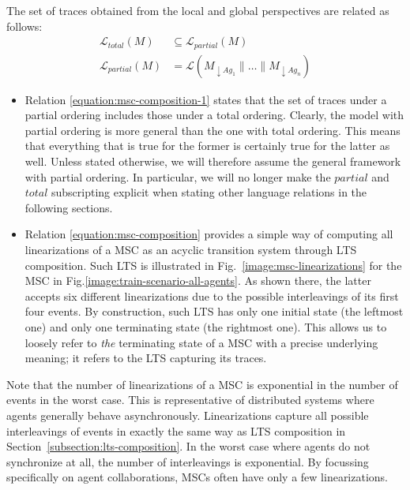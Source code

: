 The set of traces obtained from the local and global perspectives are related as follows:
\begin{align}
\mathcal{L}_{total}(M) & \subseteq \mathcal{L}_{partial}(M) 
\label{equation:msc-composition-1} \\
\mathcal{L}_{partial}(M) &= \mathcal{L}(M_{\downarrow Ag_1} \parallel \ldots \parallel M_{\downarrow Ag_n})
\label{equation:msc-composition}
\end{align}

\begin{itemize}
\item Relation \ref{equation:msc-composition-1} states that the set of traces under a partial ordering includes those under a total ordering. Clearly, the model with partial ordering is more general than the one with total ordering. This means that everything that is true for the former is certainly true for the latter as well. Unless stated otherwise, we will therefore assume the general framework with partial ordering. In particular, we will no longer make the $partial$ and $total$ subscripting explicit when stating other language relations in the following sections.

\item Relation \ref{equation:msc-composition} provides a simple way of computing all linearizations of a MSC as an acyclic transition system through LTS composition. Such LTS is illustrated in Fig.~\ref{image:msc-linearizations} for the MSC in Fig.\ref{image:train-scenario-all-agents}. As shown there, the latter accepts six different linearizations due to the possible interleavings of its first four events. By construction, such LTS has only one initial state (the leftmost one) and only one terminating state (the rightmost one). This allows us to loosely refer to \emph{the} terminating state of a MSC with a precise underlying meaning; it refers to the LTS capturing its traces.
\end{itemize}

Note that the number of linearizations of a MSC is exponential in the number of events in the worst case. This is representative of distributed systems where agents generally behave asynchronously. Linearizations capture all possible interleavings of events in exactly the same way as LTS composition in Section~\ref{subsection:lts-composition}. In the worst case where agents do not synchronize at all, the number of interleavings is exponential. By focussing specifically on agent collaborations, MSCs often have only a few linearizations.


